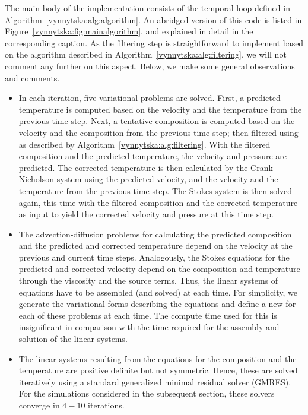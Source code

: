 The main body of the implementation consists of the temporal loop
defined in Algorithm~\ref{vynnytska:alg:algorithm}. An abridged version
of this code is listed in Figure~\ref{vynnytska:fig:mainalgorithm},
and explained in detail in the corresponding caption.  As the filtering
step is straightforward to implement based on the algorithm described in
Algorithm~\ref{vynnytska:alg:filtering}, we will not comment any further
on this aspect. Below, we make some general observations and comments.
\begin{itemize}
\item
  In each iteration, five variational problems are solved. First, a
  predicted temperature is computed based on the velocity and the
  temperature from the previous time step. Next, a tentative
  composition is computed based on the velocity and the composition
  from the previous time step; then filtered using
  as described by Algorithm~\ref{vynnytska:alg:filtering}. With the filtered
  composition and the predicted temperature, the velocity and pressure are predicted.
  The corrected temperature is then calculated by the
  Crank-Nicholson system using the predicted velocity, and
  the velocity and the temperature from the previous time step. The
  Stokes system is then solved again, this time with the filtered
  composition and the corrected temperature as input to yield the
  corrected velocity and pressure at this time step.
\item
  The advection-diffusion problems for calculating the predicted
  composition and the predicted and corrected temperature depend on
  the velocity at the previous and current time steps. Analogously,
  the Stokes equations for the predicted and corrected velocity depend
  on the composition and temperature through the viscosity and the
  source terms. Thus, the linear systems of equations have to be
  assembled (and solved) at each time. For simplicity, we generate the
  variational forms describing the equations and define a
  new  for each of these problems at each
  time. The compute time used for this is insignificant in comparison
  with the time required for the assembly and solution of the linear
  systems.
\item
  The linear systems resulting from the equations for the composition
  and the temperature are positive definite but not symmetric. Hence,
  these are solved iteratively using a standard generalized minimal
  residual solver (GMRES). For the simulations considered in the
  subsequent section, these solvers converge in $4 - 10$ iterations.

\end{itemize}
